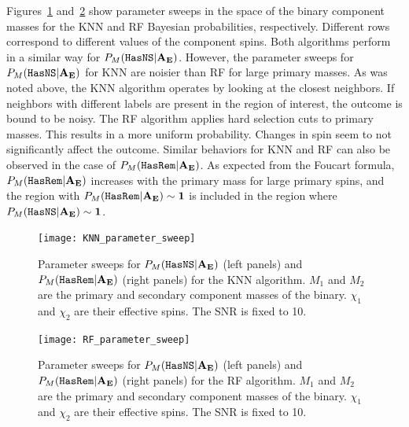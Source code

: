 Figures~\ref{fig:param_sweep_KNN} and~\ref{fig:param_sweep_RF} show parameter sweeps in the space of the binary component masses for the \ac{KNN} and \ac{RF} Bayesian probabilities,
respectively. Different rows correspond to different values of the component spins. Both algorithms perform in a similar way for $P_M({{\tt HasNS}} |\bf{A_E})$. However, the parameter sweeps for
$P_M({{\tt HasNS}} |\bf{A_E})$ for \ac{KNN} are noisier than \ac{RF} for large primary masses. As was noted above, the \ac{KNN} algorithm operates by looking at the closest neighbors. If neighbors with
different labels are present in the region of interest, the outcome is bound to be noisy. The \ac{RF} algorithm applies hard selection cuts to primary masses. This results in a more uniform
probability. Changes in spin seem to not significantly affect the outcome.  Similar behaviors for \ac{KNN} and \ac{RF} can also be observed in the case of $P_M({{\tt HasRem}} |\bf{A_E})$. As expected
from the Foucart formula, $P_M({{\tt HasRem}} |\bf{A_E})$ increases with the primary mass for large primary spins, and the region with $P_M({{\tt HasRem}} |\bf{A_E}) \sim 1$ is included in the region where
$P_M({{\tt HasNS}} |\bf{A_E}) \sim 1$.

\begin{figure}%
\texttt{[image: KNN\_parameter\_sweep]}
    \caption{Parameter sweeps for $P_M({{\tt HasNS}} |\bf{A_E})$ (left panels) and $P_M({{\tt HasRem}} |\bf{A_E})$ (right panels) for the \ac{KNN} algorithm. $M_1$ and $M_2$ are the primary and secondary component masses of the binary. $\chi_1$ and $\chi_2$ are their effective spins. The \ac{SNR} is fixed to 10.}
\label{fig:param_sweep_KNN}
\end{figure}

\begin{figure}%
\texttt{[image: RF\_parameter\_sweep]}
    \caption{Parameter sweeps for $P_M({{\tt HasNS}} |\bf{A_E})$ (left panels) and $P_M({{\tt HasRem}} |\bf{A_E})$ (right panels) for the \ac{RF} algorithm. $M_1$ and $M_2$ are the primary and secondary component masses of the binary. $\chi_1$ and $\chi_2$ are their effective spins. The \ac{SNR} is fixed to 10.}
\label{fig:param_sweep_RF}
\end{figure}



%



